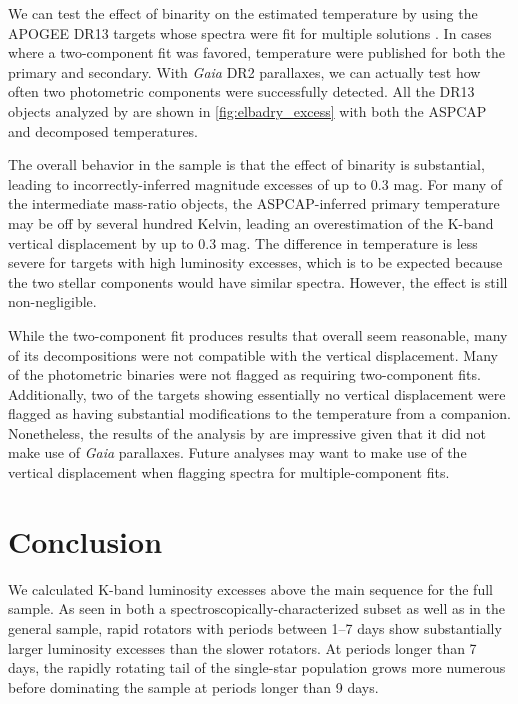 \documentclass[manuscript]{aastex6}
\newcommand{\Gaia}{\mbox{\textit{Gaia}}}
\begin{document}
We can test the effect of binarity on the estimated temperature by using the
APOGEE DR13 targets whose spectra were fit for multiple solutions
\citep{ElBadry18b}. In cases where a two-component fit was favored, temperature
were published for both the primary and secondary. With \Gaia{} DR2 parallaxes,
we can actually test how often two photometric components were successfully
detected. All the DR13 objects analyzed by \citet{ElBadry18b} are shown in
\cref{fig:elbadry_excess} with both the ASPCAP and decomposed temperatures.

The overall behavior in the \citet{ElBadry18b} sample is that the effect of 
binarity is substantial, leading to incorrectly-inferred magnitude excesses of
up to 0.3 mag. For many of the intermediate mass-ratio objects, the 
ASPCAP-inferred primary temperature may be off by several hundred Kelvin, 
leading an overestimation of the K-band vertical displacement by up to 0.3 
mag. The difference in temperature is less severe for targets with high 
luminosity excesses, which is to be expected because the two stellar 
components would have similar spectra. However, the effect is still 
non-negligible.

While the two-component fit produces results that overall seem reasonable, many
of its decompositions were not compatible with the vertical displacement. Many
of the photometric binaries were not flagged as requiring two-component fits.
Additionally, two of the targets showing essentially no vertical displacement
were flagged as having substantial modifications to the temperature from a
companion. Nonetheless, the results of the analysis by \citet{ElBadry18b} are
impressive given that it did not make use of \Gaia{} parallaxes. Future
analyses may want to make use of the vertical displacement when flagging
spectra for multiple-component fits.

\section{Conclusion}
\label{sec:conclusions}

We calculated K-band luminosity excesses above the main sequence for the full
\citet{McQuillan14} sample. As seen in both a spectroscopically-characterized
subset as well as in the general sample, rapid rotators with periods between
1--7 days show substantially larger luminosity excesses than the slower
rotators. At periods longer than 7 days, the rapidly rotating tail of the
single-star population grows more numerous before dominating the sample at
periods longer than 9 days. 
\end{document}

